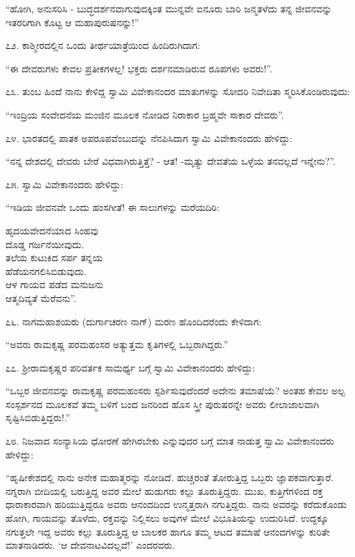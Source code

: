“ಹೋಗಿ, ಅನುಸರಿಸಿ - ಬುದ್ಧದರ್ಶನವಾಗುವುದಕ್ಕಿಂತ ಮುನ್ನವೇ ಐನೂರು ಬಾರಿ ಜನ್ಮತಳೆದು ತನ್ನ ಜೀವನವನ್ನು ಇತರರಿಗಾಗಿ ಕೊಟ್ಟ ಆ ಮಹಾಪುರುಷನನ್ನು!” 

೭೨. ಕಾಶ್ಮೀರದಲ್ಲಿನ ಒಂದು ತೀರ್ಥಯಾತ್ರೆಯಿಂದ ಹಿಂದಿರುಗಿದಾಗ:

“ಈ ದೇವರುಗಳು ಕೇವಲ ಪ್ರತೀಕಗಳಲ್ಲ! ಭಕ್ತರು ದರ್ಶನಮಾಡಿರುವ ರೂಪಗಳು ಅವರು!”. 

೭೩. ತುಂಬ ಹಿಂದೆ ನಾನು ಕೇಳಿದ್ದ ಸ್ವಾಮಿ ವಿವೇಕಾನಂದರ ಮಾತುಗಳನ್ನು ಸೋದರಿ ನಿವೇದಿತಾ ಸ್ಮರಿಸಿಕೊಂಡಿರುವುದು:

“ಇಂದ್ರಿಯ ಸಂವೇದನೆಯ ಮಂಜಿನ ಮೂಲಕ ನೋಡಿದ ನಿರಾಕಾರ ಬ್ರಹ್ಮವೇ ಸಾಕಾರ ದೇವರು”. 

೭೪. ಭಾರತದಲ್ಲಿ ಪಾತಕ ಅಪರೂಪವೆಂಬುದನ್ನು ನೆನಪಿಸಿದಾಗ ಸ್ವಾಮಿ ವಿವೇಕಾನಂದರು ಹೇಳಿದ್ದು:

“ನನ್ನ ದೇಶದಲ್ಲಿ ದೇವರು ಬೇರೆ ವಿಧವಾಗಿರುತ್ತಿತ್ತೆ? - ಆತ! -ಮೃತ್ಯು ದೇವತೆಯ ಒಳ್ಳೆಯ ತನವಲ್ಲದೆ ಇನ್ನೇನು?”. 

೭೫. ಸ್ವಾಮಿ ವಿವೇಕಾನಂದರು ಹೇಳಿದ್ದು:

“ಇಡಿಯ ಜೀವನವೇ ಒಂದು ಹಂಸಗೀತೆ! ಈ ಸಾಲುಗಳನ್ನು ಮರೆಯದಿರಿ:

\begin{myquote}
ಹೃದಯವೇದನೆಯಾದ ಸಿಂಹವು\\ದೊಡ್ಡ ಗರ್ಜನೆಯೀವುದು.\\ತಲೆಯ ಕುಟುಕಿದ ಸರ್ಪ ತನ್ನಯ\\ಹೆಡೆಯನಗಲಿಸಿಬಿಡುವುದು.\\ಆಳ ಗಾಯವ ಪಡೆದ ಮನುಜನು\\ಆತ್ಮದಿವ್ಯತೆ ಮೆರೆವನು”. 
\end{myquote}

೭೬. ನಾಗಮಹಾಶಯರು (ದುರ್ಗಾಚರಣ ನಾಗ್) ಮರಣ ಹೊಂದಿದರೆಂದು ಕೇಳಿದಾಗ:

“ಅವರು ರಾಮಕೃಷ್ಣ ಪರಮಹಂಸರ ಅತ್ಯುತ್ತಮ ಕೃತಿಗಳಲ್ಲಿ ಒಬ್ಬರಾಗಿದ್ದರು.” 

೭೭. ಶ‍್ರೀರಾಮಕೃಷ್ಣರ ಪರಿವರ್ತಕ ಸಾಮರ್ಥ್ಯ ಬಗ್ಗೆ ಸ್ವಾಮಿ ವಿವೇಕಾನಂದರು ಹೇಳಿದ್ದು:

“ಒಬ್ಬರ ಜೀವನವನ್ನು ರಾಮಕೃಷ್ಣ ಪರಮಹಂಸರು ಸ್ಪರ್ಶಿಸುವುದೆಂದರೆ ಅದೇನು ತಮಾಷೆಯೆ? ಅಂತಹ ಕೇವಲ ಅಲ್ಪ ಸಂಸ್ಪರ್ಶನದ ಮೂಲಕವೆ ತಮ್ಮ ಬಳಿಗೆ ಬಂದ ಜನರಿಂದ ಹೊಸ ಸ್ತ್ರೀ ಪುರುಷರನ್ನೇ ಅವರು ಲೀಲಾಜಾಲವಾಗಿ ಸೃಷ್ಟಿಸಿಬಿಡುತ್ತಿದ್ದರು!.” 

೭೮. ನಿಜವಾದ ಸಂನ್ಯಾಸಿಯ ಧೋರಣೆ ಹೇಗಿರಬೇಕು ಎನ್ನುವುದರ ಬಗ್ಗೆ ಮಾತ ನಾಡುತ್ತ ಸ್ವಾಮಿ ವಿವೇಕಾನಂದರು ಹೇಳಿದ್ದು:

“ಹೃಷೀಕೇಶದಲ್ಲಿ ನಾನು ಅನೇಕ ಮಹಾತ್ಮರನ್ನು ನೋಡಿದೆ. ಹುಚ್ಚರಂತೆ ತೋರುತ್ತಿದ್ದ ಒಬ್ಬರು ಜ್ಞಾಪಕವಾಗುತ್ತಾರೆ. ನಗ್ನರಾಗಿ ಬೀದಿಯಲ್ಲಿ ಬರುತ್ತಿದ್ದ ಅವರ ಮೇಲೆ ಹುಡುಗರು ಕಲ್ಲು ತೂರುತ್ತಿದ್ದರು. ಮುಖ, ಕುತ್ತಿಗೆಗಳಿಂದ ರಕ್ತ ಧಾರಾಕಾರವಾಗಿ ಹರಿಯುತ್ತಿದ್ದರೂ ಅವರು ಆನಂದದಿಂದ ಉನ್ಮತ್ತರಾಗಿ ನಗುತ್ತಿದ್ದರು. ನಾನು ಅವರನ್ನು ಕರೆದುಕೊಂಡು ಹೋಗಿ, ಗಾಯವನ್ನು ತೊಳೆದು, ರಕ್ತವನ್ನು ನಿಲ್ಲಿಸಲು ಅವುಗಳ ಮೇಲೆ ವಿಭೂತಿಯನ್ನು ಉದುರಿಸಿದೆ. ಉದ್ದಕ್ಕೂ ನಗುತ್ತಲೇ ಇದ್ದ ಅವರು ಕಲ್ಲು ತೂರುತ್ತಿದ್ದ ಆ ಬಾಲಕರ ಹಾಗೂ ತಮ್ಮ ಆಟದ ತಮಾಷೆ ಆನಂದಗಳನ್ನು ಕುರಿತೇ ಮಾತನಾಡಿದರು. ‘ಆ ದೇವನಾಟವಿದಲ್ಲವೆ!’ ಎಂದರವರು.

